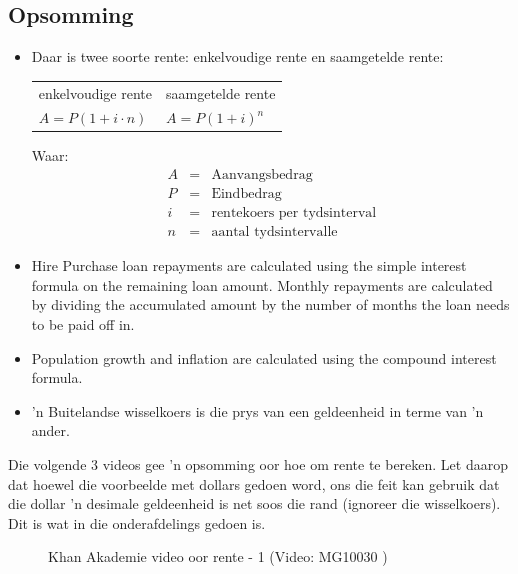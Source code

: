 \subsection{Opsomming}

\begin{itemize}
    \item Daar is twee soorte rente: enkelvoudige rente en saamgetelde rente:\\
    
    \begin{tabularx}{\textwidth}{ XX }
	enkelvoudige rente	&	saamgetelde rente\\
	$A = P (1 + i \cdot n)$	&	$A = P(1 + i)^n$\\
    \end{tabularx}
    \par
    Waar:
    \begin{eqnarray*}
	A &=& \text{Aanvangsbedrag}\\
	P &=& \text{Eindbedrag}\\
	i &=& \text{rentekoers per tydsinterval}\\
	n &=& \text{aantal tydsintervalle}
    \end{eqnarray*}

    \item Hire Purchase loan repayments are calculated using the simple interest formula on the remaining loan amount. Monthly repayments are calculated by dividing the accumulated amount by the number of months the loan needs to be paid off in.

    \item Population growth and inflation are calculated using the compound interest formula.

    \item ’n Buitelandse wisselkoers is die prys van een geldeenheid in terme van ’n ander.
\end{itemize}


Die volgende 3 videos gee ’n opsomming oor hoe om rente te bereken. Let daarop dat hoewel die voorbeelde
met dollars gedoen word, ons die feit kan gebruik dat die dollar ’n desimale geldeenheid is net soos die rand
(ignoreer die wisselkoers). Dit is wat in die onderafdelings gedoen is.\par 

\begin{figure}[H]
    \textnormal{Khan Akademie video oor rente - 1}
    \vspace{.1in}
    \nopagebreak
     { (Video:  MG10030 )}
 \end{figure}

